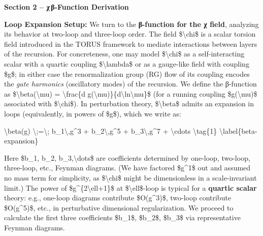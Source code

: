 \documentclass[]{article}
\begin{document}
\textbf{Section 2 -- χ\,β‑Function Derivation}

\textbf{Loop Expansion Setup:} We turn to the \textbf{β-function for the
χ field}, analyzing its behavior at two-loop and three-loop order. The
field \$\textbackslash{}chi\$ is a scalar torsion field introduced in
the TORUS framework to mediate interactions between layers of the
recursion. For concreteness, one may model \$\textbackslash{}chi\$ as a
self-interacting scalar with a quartic coupling
\$\textbackslash{}lambda\$ or as a gauge-like field with coupling \$g\$;
in either case the renormalization group (RG) flow of its coupling
encodes the \emph{gate harmonics} (oscillatory modes) of the recursion.
We define the β-function as \$\textbackslash{}beta(\textbackslash{}mu) =
\textbackslash{}frac\{d
g(\textbackslash{}mu)\}\{d\textbackslash{}ln\textbackslash{}mu\}\$ (for
a running coupling \$g(\textbackslash{}mu)\$ associated with
\$\textbackslash{}chi\$)​. In perturbation theory,
\$\textbackslash{}beta\$ admits an expansion in loops (equivalently, in
powers of \$g\$), which we write as:

\textbackslash{}beta(g) \textbackslash{};=\textbackslash{};
b\_1\textbackslash{},g\^{}3 + b\_2\textbackslash{},g\^{}5 +
b\_3\textbackslash{},g\^{}7 + \textbackslash{}cdots
\textbackslash{}tag\{1\} \textbackslash{}label\{beta-expansion\}

Here \$b\_1, b\_2, b\_3,\textbackslash{}dots\$ are coefficients
determined by one-loop, two-loop, three-loop, etc., Feynman diagrams​.
(We have factored \$g\^{}1\$ out and assumed no mass term for
simplicity, as \$\textbackslash{}chi\$ might be dimensionless in a
scale-invariant limit.) The power of \$g\^{}\{2\textbackslash{}ell+1\}\$
at \$\textbackslash{}ell\$-loop is typical for a \textbf{quartic scalar}
theory: e.g., one-loop diagrams contribute \$O(g\^{}3)\$, two-loop
contribute \$O(g\^{}5)\$, etc., in perturbative dimensional
regularization. We proceed to calculate the first three coefficients
\$b\_1\$, \$b\_2\$, \$b\_3\$ via representative Feynman diagrams.
\end{document}
